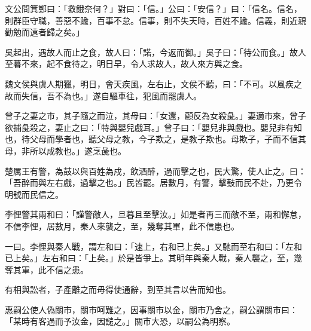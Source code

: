 \begin{pinyinscope}
文公問箕鄭曰：「救餓奈何？」對曰：「信。」公曰：「安信？」曰：「信名。信名，則群臣守職，善惡不踰，百事不怠。信事，則不失天時，百姓不踰。信義，則近親勸勉而遠者歸之矣。」

吳起出，遇故人而止之食，故人曰：「諾，今返而御。」吳子曰：「待公而食。」故人至暮不來，起不食待之，明日早，令人求故人，故人來方與之食。

魏文侯與虞人期獵，明日，會天疾風，左右止，文侯不聽，曰：「不可。以風疾之故而失信，吾不為也。」遂自驅車往，犯風而罷虞人。

曾子之妻之市，其子隨之而泣，其母曰：「女還，顧反為女殺彘。」妻適市來，曾子欲捕彘殺之，妻止之曰：「特與嬰兒戲耳。」曾子曰：「嬰兒非與戲也。嬰兒非有知也，待父母而學者也，聽父母之教，今子欺之，是教子欺也。母欺子，子而不信其母，非所以成教也。」遂烹彘也。

楚厲王有警，為鼓以與百姓為戍，飲酒醉，過而擊之也，民大驚，使人止之。曰：「吾醉而與左右戲，過擊之也。」民皆罷。居數月，有警，擊鼓而民不赴，乃更令明號而民信之。

李悝警其兩和曰：「謹警敵人，旦暮且至擊汝。」如是者再三而敵不至，兩和懈怠，不信李悝，居數月，秦人來襲之，至，幾奪其軍，此不信患也。

一曰。李悝與秦人戰，謂左和曰：「速上，右和已上矣。」又馳而至右和曰：「左和已上矣。」左右和曰：「上矣。」於是皆爭上。其明年與秦人戰，秦人襲之，至，幾奪其軍，此不信之患。

有相與訟者，子產離之而毋得使通辭，到至其言以告而知也。

惠嗣公使人偽關市，關市呵難之，因事關市以金，關市乃舍之，嗣公謂關市曰：「某時有客過而予汝金，因譴之。」關市大恐，以嗣公為明察。


\end{pinyinscope}